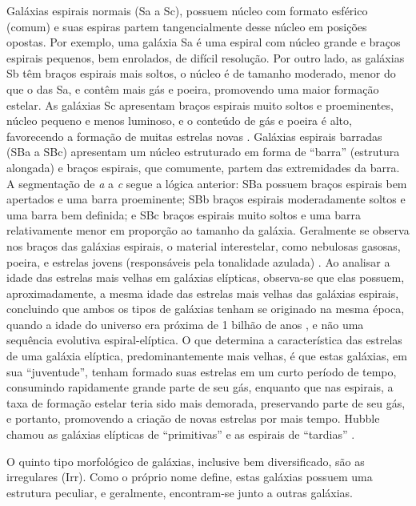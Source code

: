 Galáxias espirais normais (Sa a Sc), possuem núcleo com formato esférico (comum) e suas espiras partem tangencialmente desse núcleo em posições opostas. Por exemplo, uma galáxia Sa é uma espiral com núcleo grande e braços espirais pequenos, bem enrolados, de difícil resolução. Por outro lado, as galáxias Sb têm braços espirais mais soltos, o núcleo é de tamanho moderado, menor do que o das Sa, e contêm mais gás e poeira, promovendo uma maior formação estelar. As galáxias Sc apresentam braços espirais muito soltos e proeminentes, núcleo pequeno e menos luminoso, e o conteúdo de gás e poeira é alto, favorecendo a formação de muitas estrelas novas \cite{2023Kepler,2022gastao}. Galáxias espirais barradas (SBa a SBc) apresentam um núcleo estruturado em forma de ``barra'' (estrutura alongada) e braços espirais, que comumente, partem das extremidades da barra. A segmentação de \emph{a} a \emph{c} segue a lógica anterior: SBa possuem braços espirais bem apertados e uma barra proeminente; SBb braços espirais moderadamente soltos e uma barra bem definida; e SBc braços espirais muito soltos e uma barra relativamente menor em proporção ao tamanho da galáxia. Geralmente se observa nos braços das galáxias espirais, o material interestelar, como nebulosas gasosas, poeira, e estrelas jovens (responsáveis pela tonalidade azulada) \cite{2023Kepler}. Ao analisar a idade das estrelas mais velhas em galáxias elípticas, observa-se que elas possuem, aproximadamente, a mesma idade das estrelas mais velhas das galáxias espirais, concluindo que ambos os tipos de galáxias tenham se originado na mesma época, quando a idade do universo era próxima de 1 bilhão de anos \cite{2023Muller}, e não uma sequência evolutiva espiral-elíptica. O que determina a característica das estrelas de uma galáxia elíptica, predominantemente mais velhas, é que estas galáxias, em sua ``juventude'', tenham formado suas estrelas em um curto período de tempo, consumindo rapidamente grande parte de seu gás, enquanto que nas espirais, a taxa de formação estelar teria sido mais demorada, preservando parte de seu gás, e portanto, promovendo a criação de novas estrelas por mais tempo. Hubble chamou as galáxias elípticas de ``primitivas'' e as espirais de ``tardias'' \cite{2022gastao, 2010arnab}.

O quinto tipo morfológico de galáxias, inclusive bem diversificado, são as irregulares (Irr). Como o próprio nome define, estas galáxias possuem uma estrutura peculiar, e geralmente, encontram-se junto a outras galáxias.

